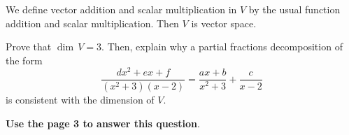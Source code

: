 \documentclass[10pt]{article}
\newcommand{\noin}{\noindent}
\begin{document}
\noin We define vector addition and scalar multiplication in $V$ by the usual function addition and scalar multiplication.  Then $V$ is vector space.

\vspace{20pt}

\noin{(a)}  Prove that $\dim\, V =3$.  Then, explain why a partial fractions decomposition of the form
$$\frac{dx^2+ex+f}{(x^2+3)(x-2)}  = \frac{ax+b}{x^2+3}+\frac{c}{x-2}$$
is consistent with the dimension of $V$. \\

\begin{center}
{\bf Use the page 3 to answer this question}.
\end{center}




\pagebreak

\noin{1(a)}

\end{document}
